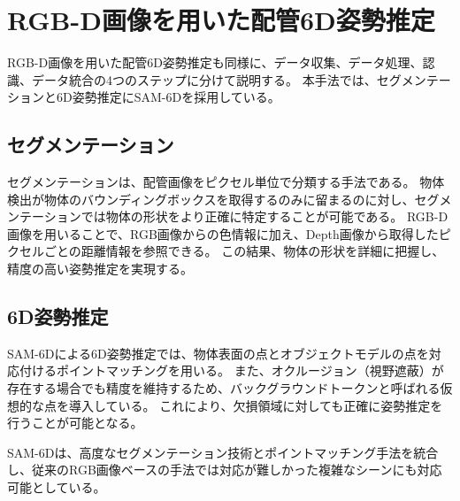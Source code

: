 \section{RGB-D画像を用いた配管6D姿勢推定} 
RGB-D画像を用いた配管6D姿勢推定も同様に、データ収集、データ処理、認識、データ統合の4つのステップに分けて説明する。
本手法では、セグメンテーションと6D姿勢推定にSAM-6Dを採用している。

\subsection{セグメンテーション}
セグメンテーションは、配管画像をピクセル単位で分類する手法である。
物体検出が物体のバウンディングボックスを取得するのみに留まるのに対し、セグメンテーションでは物体の形状をより正確に特定することが可能である。
RGB-D画像を用いることで、RGB画像からの色情報に加え、Depth画像から取得したピクセルごとの距離情報を参照できる。
この結果、物体の形状を詳細に把握し、精度の高い姿勢推定を実現する。

\subsection{6D姿勢推定}
SAM-6Dによる6D姿勢推定では、物体表面の点とオブジェクトモデルの点を対応付けるポイントマッチングを用いる。
また、オクルージョン（視野遮蔽）が存在する場合でも精度を維持するため、バックグラウンドトークンと呼ばれる仮想的な点を導入している。
これにより、欠損領域に対しても正確に姿勢推定を行うことが可能となる。

SAM-6Dは、高度なセグメンテーション技術とポイントマッチング手法を統合し、従来のRGB画像ベースの手法では対応が難しかった複雑なシーンにも対応可能としている。





